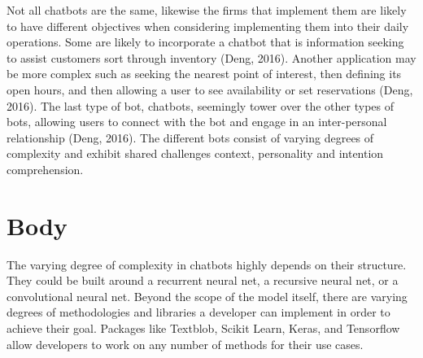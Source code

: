 \documentclass[12pt,english]{article}
\begin{document}
Not all chatbots are the same, likewise the firms that implement them are likely to have different objectives when considering implementing them into their daily operations. Some are likely to incorporate a chatbot that is information seeking to assist customers sort through inventory (Deng, 2016). Another application may be more complex such as seeking the nearest point of interest, then defining its open hours, and then allowing a user to see availability or set reservations (Deng, 2016). The last type of bot, chatbots, seemingly tower over the other types of bots, allowing users to connect with the bot and engage in an inter-personal relationship (Deng, 2016). The different bots consist of varying degrees of complexity and exhibit shared challenges context, personality and intention comprehension. 

\section{Body}  
The varying degree of complexity in chatbots highly depends on their structure. They could be built around a recurrent neural net, a recursive neural net, or a convolutional neural net. Beyond the scope of the model itself, there are varying degrees of methodologies and libraries a developer can implement in order to achieve their goal. Packages like Textblob, Scikit Learn, Keras, and Tensorflow allow developers to work on any number of methods for their use cases.
\end{document}
